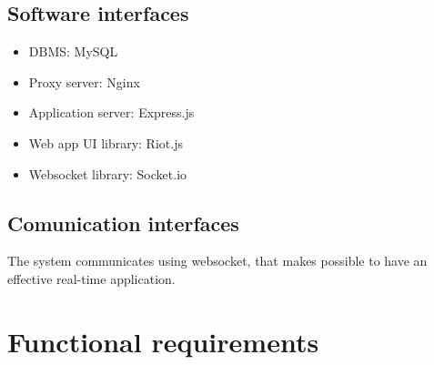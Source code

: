 \subsection{Software interfaces}
\begin{itemize}
\item DBMS: MySQL
\item Proxy server: Nginx
\item Application server: Express.js
\item Web app UI library: Riot.js
\item Websocket library: Socket.io
\end{itemize}
\subsection{Comunication interfaces}
The system communicates using websocket, that makes possible to have an effective real-time application.

\section{Functional requirements}

